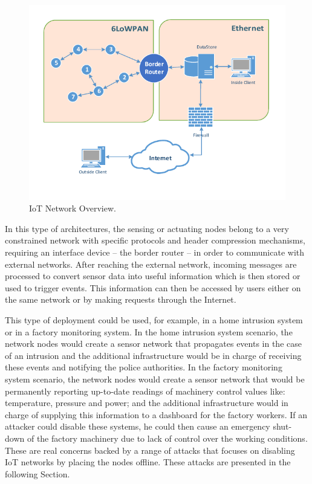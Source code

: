 \documentclass{sig-alternate-05-2015}
\begin{document}
\begin{figure}[h]
  \centering
  \includegraphics[width=1.0\linewidth]{figures/Network_Overview.pdf}
  \caption{IoT Network Overview.}
  \label{fig:net_overview}
\end{figure}

In this type of architectures, the sensing or actuating nodes belong to a very constrained network with specific protocols and header compression mechanisms, requiring an interface device -- the border router -- in order to communicate with external networks.
After reaching the external network, incoming messages are processed to convert sensor data into useful information which is then stored or used to trigger events. 
This information can then be accessed by users either on the same network or by making requests through the Internet. 

This type of deployment could be used, for example, in a home intrusion system or in a factory monitoring system. 
In the home intrusion system scenario, the network nodes would create a sensor network that propagates events in the case of an intrusion and the additional infrastructure would be in charge of receiving these events and notifying the police authorities. 
In the factory monitoring system scenario, the network nodes would create a sensor network that would be permanently reporting up-to-date readings of machinery control values like: temperature, pressure and power; 
and the additional infrastructure would in charge of supplying this information to a dashboard for the factory workers. 
If an attacker could disable these systems, he could then 
cause an emergency shut-down of the factory machinery due to lack of control over the working conditions. 
These are real concerns backed by a range of attacks that focuses on disabling \gls{IoT} networks by placing the nodes offline. These attacks are presented in the following Section.
\end{document}
